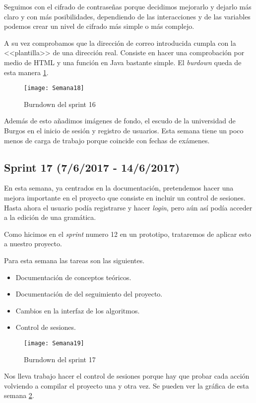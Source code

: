 Seguimos con el cifrado de contraseñas porque decidimos mejorarlo y dejarlo más claro y con más posibilidades, dependiendo de las interacciones y de las variables podemos crear un nivel de cifrado más simple o más complejo. 

A su vez comprobamos que la dirección de correo introducida cumpla con la <<plantilla>> de una dirección real. Consiste en hacer una comprobación por medio de HTML y una función en Java bastante simple. El \emph{burdown} queda de esta manera \ref{fig:A.15}.

\begin{figure}[h]
\centering
\texttt{[image: Semana18]}
\caption{Burndown del sprint 16}
\label{fig:A.15}
\end{figure}

Además de esto añadimos imágenes de fondo, el escudo de la universidad de Burgos en el inicio de sesión y registro de usuarios. Esta semana tiene un poco menos de carga de trabajo porque coincide con fechas de exámenes.

\subsection{Sprint 17 (7/6/2017 - 14/6/2017)}

En esta semana, ya centrados en la documentación, pretendemos hacer una mejora importante en el proyecto que consiste en incluir un control de sesiones. Hasta ahora el usuario podía registrarse y hacer \emph{login}, pero aún así podía acceder a la edición de una gramática.

Como hicimos en el \emph{sprint} numero 12 en un prototipo, trataremos de aplicar esto a nuestro proyecto.

Para esta semana las tareas son las siguientes.
\begin{itemize}
\item Documentación de conceptos teóricos.
\item Documentación de del seguimiento del proyecto.
\item Cambios en la interfaz de los algoritmos.
\item Control de sesiones.
\end{itemize}

\begin{figure}[h]
\centering
\texttt{[image: Semana19]}
\caption{Burndown del sprint 17}
\label{fig:A.16}
\end{figure}

Nos lleva trabajo hacer el control de sesiones porque hay que probar cada acción volviendo a compilar el proyecto una y otra vez. Se pueden ver la gráfica de esta semana \ref{fig:A.16}.

